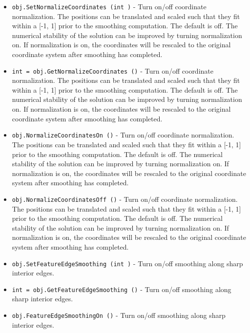 \begin{itemize}
\item  \verb|obj.SetNormalizeCoordinates (int )| -  Turn on/off coordinate normalization.  The positions can be
 translated and scaled such that they fit within a [-1, 1] prior
 to the smoothing computation. The default is off.  The numerical
 stability of the solution can be improved by turning
 normalization on.  If normalization is on, the coordinates will
 be rescaled to the original coordinate system after smoothing has
 completed.

\item  \verb|int = obj.GetNormalizeCoordinates ()| -  Turn on/off coordinate normalization.  The positions can be
 translated and scaled such that they fit within a [-1, 1] prior
 to the smoothing computation. The default is off.  The numerical
 stability of the solution can be improved by turning
 normalization on.  If normalization is on, the coordinates will
 be rescaled to the original coordinate system after smoothing has
 completed.

\item  \verb|obj.NormalizeCoordinatesOn ()| -  Turn on/off coordinate normalization.  The positions can be
 translated and scaled such that they fit within a [-1, 1] prior
 to the smoothing computation. The default is off.  The numerical
 stability of the solution can be improved by turning
 normalization on.  If normalization is on, the coordinates will
 be rescaled to the original coordinate system after smoothing has
 completed.

\item  \verb|obj.NormalizeCoordinatesOff ()| -  Turn on/off coordinate normalization.  The positions can be
 translated and scaled such that they fit within a [-1, 1] prior
 to the smoothing computation. The default is off.  The numerical
 stability of the solution can be improved by turning
 normalization on.  If normalization is on, the coordinates will
 be rescaled to the original coordinate system after smoothing has
 completed.

\item  \verb|obj.SetFeatureEdgeSmoothing (int )| -  Turn on/off smoothing along sharp interior edges.

\item  \verb|int = obj.GetFeatureEdgeSmoothing ()| -  Turn on/off smoothing along sharp interior edges.

\item  \verb|obj.FeatureEdgeSmoothingOn ()| -  Turn on/off smoothing along sharp interior edges.


\end{itemize}
